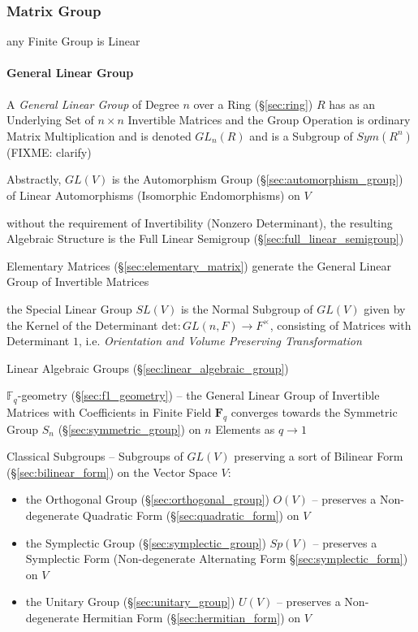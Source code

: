 \subsubsection{Matrix Group}\label{sec:matrix_group}

any Finite Group is Linear



\paragraph{General Linear Group}\label{sec:general_linear_group}\hfill

A \emph{General Linear Group} of Degree $n$ over a Ring (\S\ref{sec:ring}) $R$
has as an Underlying Set of $n \times n$ Invertible Matrices and the Group
Operation is ordinary Matrix Multiplication and is denoted $GL_n(R)$ and is a
Subgroup of $Sym(R^n)$ (FIXME: clarify)

Abstractly, $GL(V)$ is the Automorphism Group (\S\ref{sec:automorphism_group})
of Linear Automorphisms (Isomorphic Endomorphisms) on $V$

without the requirement of Invertibility (Nonzero Determinant), the resulting
Algebraic Structure is the Full Linear Semigroup
(\S\ref{sec:full_linear_semigroup})

Elementary Matrices (\S\ref{sec:elementary_matrix}) generate the General Linear
Group of Invertible Matrices

the Special Linear Group $SL(V)$ is the Normal Subgroup of $GL(V)$ given by the
Kernel of the Determinant $\mathrm{det} : GL(n,F) \rightarrow F^\times$,
consisting of Matrices with Determinant $1$, i.e. \emph{Orientation and Volume
  Preserving Transformation}

\fist Linear Algebraic Groups (\S\ref{sec:linear_algebraic_group})

\fist $\mathbb{F}_q$-geometry (\S\ref{sec:f1_geometry}) -- the General Linear
Group of Invertible Matrices with Coefficients in Finite Field $\mathbf{F}_q$
converges towards the Symmetric Group $S_n$ (\S\ref{sec:symmetric_group}) on $n$
Elements as $q \rightarrow 1$

Classical Subgroups -- Subgroups of $GL(V)$ preserving a sort of Bilinear Form
(\S\ref{sec:bilinear_form}) on the Vector Space $V$:
\begin{itemize}
  \item the Orthogonal Group (\S\ref{sec:orthogonal_group}) $O(V)$ -- preserves
    a Non-degenerate Quadratic Form (\S\ref{sec:quadratic_form}) on $V$
  \item the Symplectic Group (\S\ref{sec:symplectic_group}) $Sp(V)$
    -- preserves a Symplectic Form (Non-degenerate Alternating Form
    \S\ref{sec:symplectic_form}) on $V$
  \item the Unitary Group (\S\ref{sec:unitary_group}) $U(V)$
    -- preserves a Non-degenerate Hermitian Form (\S\ref{sec:hermitian_form})
    on $V$
\end{itemize}

